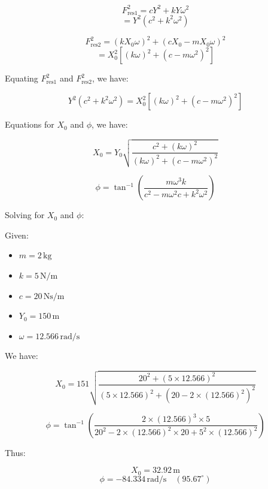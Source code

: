 \documentclass[12pt,a4paper]{article}
\begin{document}
\[
F_{\text{res1}}^2 = c Y^2 + k Y \omega^2
\]
\[
= Y^2 (c^2 + k^2 \omega^2)
\]

\[
F_{\text{res2}}^2 = (k X_0 \omega)^2 + (c X_0 - m X_0 \omega)^2
\]
\[
= X_0^2 \left[ (k \omega)^2 + (c - m \omega^2)^2 \right]
\]

{\vspace{5pt}}

Equating \( F_{\text{res1}}^2 \) and \( F_{\text{res2}}^2 \), we have:

\[
Y^2 (c^2 + k^2 \omega^2) = X_0^2 \left[ (k \omega)^2 + (c - m \omega^2)^2 \right]
\]

{\vspace{5pt}}

Equations for \( X_0 \) and \( \phi \), we have:

\[
X_0 = Y_0 \sqrt{ \frac{c^2 + (k \omega)^2}{(k \omega)^2 + (c - m \omega^2)^2} }
\]

\[
\phi = \tan^{-1}\left( \frac{m \omega^3 k}{c^2 - m \omega^2 c + k^2 \omega^2} \right)
\]

{\vspace{5pt}}

Solving for \( X_0 \) and \( \phi \):

Given:
\begin{itemize}
    \item \( m = 2 \, \text{kg} \)
    \item \( k = 5 \, \text{N/m} \)
    \item \( c = 20 \, \text{Ns/m} \)
    \item \( Y_0 = 150 \, \text{m} \)
    \item \( \omega = 12.566 \, \text{rad/s} \)
\end{itemize}

{\vspace{5pt}}

We have:

\[
X_0 = 151 \sqrt{ \frac{20^2 + (5 \times 12.566)^2}{(5 \times 12.566)^2 + (20 - 2 \times (12.566)^2)^2} }
\]

\[
\phi = \tan^{-1}\left( \frac{2 \times (12.566)^3 \times 5}{20^2 - 2 \times (12.566)^2 \times 20 + 5^2 \times (12.566)^2} \right)
\]

{\vspace{5pt}}

Thus:

\[
X_0 = 32.92 \, \text{m}
\]
\[
\phi = -84.334 \, \text{rad/s} \quad (95.67^\circ)
\]

{\vspace{5pt}}
\end{document}
